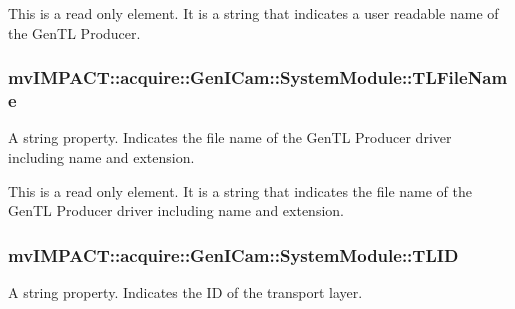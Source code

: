 This is a read only element. It is a string that indicates a user readable name of the Gen\+T\+L Producer. \hypertarget{classmv_i_m_p_a_c_t_1_1acquire_1_1_gen_i_cam_1_1_system_module_a4f77060028e0d27ae600a3a197adb65d}{
\subsubsection[{T\+L\+File\+Name}]{ mv\+I\+M\+P\+A\+C\+T\+::acquire\+::\+Gen\+I\+Cam\+::\+System\+Module\+::\+T\+L\+File\+Name}}\label{classmv_i_m_p_a_c_t_1_1acquire_1_1_gen_i_cam_1_1_system_module_a4f77060028e0d27ae600a3a197adb65d}


A string property. Indicates the file name of the Gen\+T\+L Producer driver including name and extension. 

This is a read only element. It is a string that indicates the file name of the Gen\+T\+L Producer driver including name and extension. \hypertarget{classmv_i_m_p_a_c_t_1_1acquire_1_1_gen_i_cam_1_1_system_module_a4ed6c131c7c3bbd4ceb979fcd04a4f4b}{
\subsubsection[{T\+L\+I\+D}]{ mv\+I\+M\+P\+A\+C\+T\+::acquire\+::\+Gen\+I\+Cam\+::\+System\+Module\+::\+T\+L\+I\+D}}\label{classmv_i_m_p_a_c_t_1_1acquire_1_1_gen_i_cam_1_1_system_module_a4ed6c131c7c3bbd4ceb979fcd04a4f4b}


A string property. Indicates the I\+D of the transport layer. 

